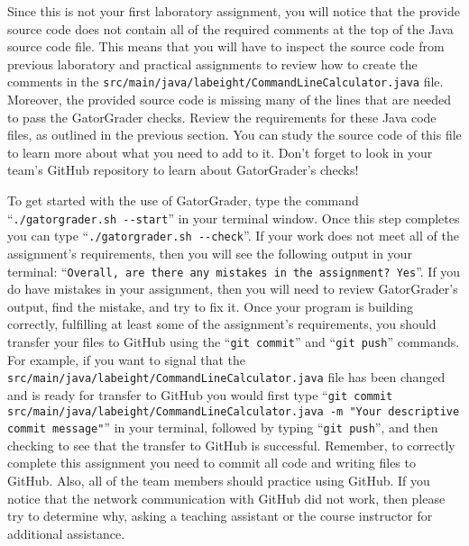 \documentclass[11pt]{article}
\newcommand{\mainprogramsource}{\lstinline{src/main/java/labeight/CommandLineCalculator.java}}
\newcommand{\gatorgraderstart}{\command{./gatorgrader.sh --start}}
\newcommand{\gatorgradercheck}{\command{./gatorgrader.sh --check}}
\newcommand{\gitcommit}{\command{git commit}}
\newcommand{\gitpush}{\command{git push}}
\newcommand{\gitcommitmainprogram}{\command{git commit src/main/java/labeight/CommandLineCalculator.java -m "Your
descriptive commit message"}}
\newcommand{\command}[1]{``\lstinline{#1}''}
\begin{document}
Since this is not your first laboratory assignment, you will notice that the provide source code does not contain all of
the required comments at the top of the Java source code file. This means that you will have to inspect the source code
from previous laboratory and practical assignments to review how to create the comments in the \mainprogramsource{}
file. Moreover, the provided source code is missing many of the lines that are needed to pass the GatorGrader checks.
Review the requirements for these Java code files, as outlined in the previous section. You can study the source code of
this file to learn more about what you need to add to it. Don't forget to look in your team's GitHub repository to learn
about GatorGrader's checks!

To get started with the use of GatorGrader, type the command \gatorgraderstart{} in your terminal window. Once this step
completes you can type \gatorgradercheck{}. If your work does not meet all of the assignment's requirements, then you
will see the following output in your terminal: \command{Overall, are there any mistakes in the assignment? Yes}. If you
do have mistakes in your assignment, then you will need to review GatorGrader's output, find the mistake, and try to fix
it. Once your program is building correctly, fulfilling at least some of the assignment's requirements, you should
transfer your files to GitHub using the \gitcommit{} and \gitpush{} commands. For example, if you want to signal that
the \mainprogramsource{} file has been changed and is ready for transfer to GitHub you would first type
\gitcommitmainprogram{} in your terminal, followed by typing \gitpush{}, and then checking to see that the transfer to
GitHub is successful. Remember, to correctly complete this assignment you need to commit all code and writing files to
GitHub. Also, all of the team members should practice using GitHub. If you notice that the network communication with
GitHub did not work, then please try to determine why, asking a teaching assistant or the course instructor for
additional assistance.
\end{document}

